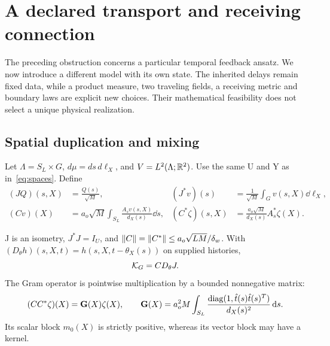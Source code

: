 \section{A declared transport and receiving connection}\label{sec:transport}
The preceding obstruction concerns a particular temporal feedback ansatz. We now introduce a different model with its own state. The inherited delays remain fixed data, while a product measure, two traveling fields, a receiving metric and boundary laws are explicit new choices. Their mathematical feasibility does not select a unique physical realization.

\subsection{Spatial duplication and mixing}
Let $\Lambda=S_L\times G$, $d\mu=ds\,d\ell_X$, and $V=L^2(\Lambda;\mathbb R^2)$. Use the same U and Y as in~\eqref{eq:spaces}. Define
\begin{align}
(JQ)(s,X)&=\frac{Q(s)}{\sqrt M},&
(J^*v)(s)&=\frac1{\sqrt M}\int_Gv(s,X)\dd\ell_X,\label{eq:J}\\
(Cv)(X)&=a_o\sqrt M\int_{S_L}\frac{A_sv(s,X)}{d_X(s)}\dd s,&
(C^*\zeta)(s,X)&=\frac{a_o\sqrt M}{d_X(s)}A_s^*\zeta(X).\label{eq:Cspatial}
\end{align}
\begin{proposition}\label{prop:factorization}
J is an isometry, $J^*J=I_U$, and $\left\lVert C\right\rVert=\left\lVert C^*\right\rVert\le a_o\sqrt{LM}/\delta_w$. With $(D_\theta h)(s,X,t)=h(s,X,t-\theta_X(s))$ on supplied histories,
\begin{equation}\label{eq:factorization}
\mathcal K_G=CD_\theta J.
\end{equation}
The Gram operator is pointwise multiplication by a bounded nonnegative matrix:
\begin{equation}\label{eq:Gram}
(CC^*\zeta)(X)=\mathbf G(X)\zeta(X),\qquad
\mathbf G(X)=a_o^2M\int_{S_L}\frac{\operatorname{diag}(1,\hat t(s)\hat t(s)^T)}{d_X(s)^2}\,\mathrm d s.
\end{equation}
Its scalar block $m_0(X)$ is strictly positive, whereas its vector block may have a kernel.
\end{proposition}
